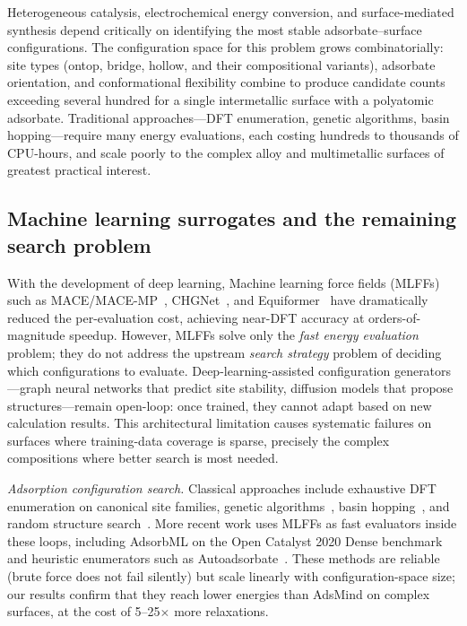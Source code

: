 Heterogeneous catalysis, electrochemical energy conversion, and surface-mediated synthesis depend critically on identifying the most stable adsorbate--surface configurations.
The configuration space for this problem grows combinatorially: site types (ontop, bridge, hollow, and their compositional variants), adsorbate orientation, and conformational flexibility combine to produce candidate counts exceeding several hundred for a single intermetallic surface with a polyatomic adsorbate.
Traditional approaches---DFT enumeration, genetic algorithms, basin hopping---require many energy evaluations, each costing hundreds to thousands of CPU-hours, and scale poorly to the complex alloy and multimetallic surfaces of greatest practical interest.

\subsection{Machine learning surrogates and the remaining search problem}
With the development of deep learning, Machine learning force fields (MLFFs) such as MACE/MACE-MP~\cite{batatia2022mace,batatia2023foundation}, CHGNet~\cite{deng2023chgnet}, and Equiformer~\cite{liao2023equiformerv2} have dramatically reduced the per-evaluation cost, achieving near-DFT accuracy at orders-of-magnitude speedup.
However, MLFFs solve only the \textit{fast energy evaluation} problem; they do not address the upstream \textit{search strategy} problem of deciding which configurations to evaluate.
Deep-learning-assisted configuration generators---graph neural networks that predict site stability, diffusion models that propose structures---remain open-loop: once trained, they cannot adapt based on new calculation results.
This architectural limitation causes systematic failures on surfaces where training-data coverage is sparse, precisely the complex compositions where better search is most needed.

\textit{Adsorption configuration search.}
Classical approaches include exhaustive DFT enumeration on canonical site families, genetic algorithms~\cite{vilhelmsen2014genetic}, basin hopping~\cite{wales1997global}, and random structure search~\cite{pickard2011ab}.
More recent work uses MLFFs as fast evaluators inside these loops, including AdsorbML on the Open Catalyst 2020 Dense benchmark~\cite{lan2023adsorbml} and heuristic enumerators such as Autoadsorbate~\cite{fako2025simple}.
These methods are reliable (brute force does not fail silently) but scale linearly with configuration-space size; our results confirm that they reach lower energies than AdsMind on complex surfaces, at the cost of 5--25$\times$ more relaxations.


